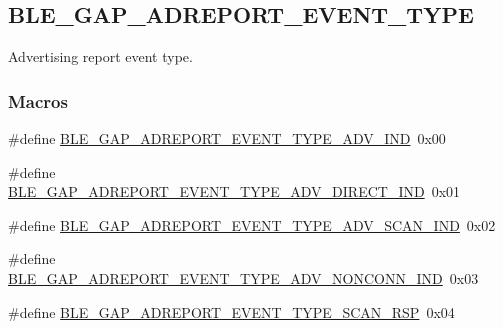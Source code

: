 \hypertarget{group___b_l_e___g_a_p___a_d_r_e_p_o_r_t___e_v_e_n_t___t_y_p_e}{}\subsection{B\+L\+E\+\_\+\+G\+A\+P\+\_\+\+A\+D\+R\+E\+P\+O\+R\+T\+\_\+\+E\+V\+E\+N\+T\+\_\+\+T\+Y\+PE}
\label{group___b_l_e___g_a_p___a_d_r_e_p_o_r_t___e_v_e_n_t___t_y_p_e}


Advertising report event type.  


\subsubsection*{Macros}
\begin{DoxyCompactItemize}
\item 
\#define \hyperlink{group___b_l_e___g_a_p___a_d_r_e_p_o_r_t___e_v_e_n_t___t_y_p_e_ga6bb482dae16c06831c3ade2057ad8365}{B\+L\+E\+\_\+\+G\+A\+P\+\_\+\+A\+D\+R\+E\+P\+O\+R\+T\+\_\+\+E\+V\+E\+N\+T\+\_\+\+T\+Y\+P\+E\+\_\+\+A\+D\+V\+\_\+\+I\+ND}~0x00
\item 
\#define \hyperlink{group___b_l_e___g_a_p___a_d_r_e_p_o_r_t___e_v_e_n_t___t_y_p_e_ga32215d36f7b60058d262a8648de92d38}{B\+L\+E\+\_\+\+G\+A\+P\+\_\+\+A\+D\+R\+E\+P\+O\+R\+T\+\_\+\+E\+V\+E\+N\+T\+\_\+\+T\+Y\+P\+E\+\_\+\+A\+D\+V\+\_\+\+D\+I\+R\+E\+C\+T\+\_\+\+I\+ND}~0x01
\item 
\#define \hyperlink{group___b_l_e___g_a_p___a_d_r_e_p_o_r_t___e_v_e_n_t___t_y_p_e_gafa7c714a9a1e84a12bf953f42a290a47}{B\+L\+E\+\_\+\+G\+A\+P\+\_\+\+A\+D\+R\+E\+P\+O\+R\+T\+\_\+\+E\+V\+E\+N\+T\+\_\+\+T\+Y\+P\+E\+\_\+\+A\+D\+V\+\_\+\+S\+C\+A\+N\+\_\+\+I\+ND}~0x02
\item 
\#define \hyperlink{group___b_l_e___g_a_p___a_d_r_e_p_o_r_t___e_v_e_n_t___t_y_p_e_ga5a43b358d1ea2c89d4c5761cfef14b1d}{B\+L\+E\+\_\+\+G\+A\+P\+\_\+\+A\+D\+R\+E\+P\+O\+R\+T\+\_\+\+E\+V\+E\+N\+T\+\_\+\+T\+Y\+P\+E\+\_\+\+A\+D\+V\+\_\+\+N\+O\+N\+C\+O\+N\+N\+\_\+\+I\+ND}~0x03
\item 
\#define \hyperlink{group___b_l_e___g_a_p___a_d_r_e_p_o_r_t___e_v_e_n_t___t_y_p_e_ga41c1d44a55b98b7790ebb4020e1de75e}{B\+L\+E\+\_\+\+G\+A\+P\+\_\+\+A\+D\+R\+E\+P\+O\+R\+T\+\_\+\+E\+V\+E\+N\+T\+\_\+\+T\+Y\+P\+E\+\_\+\+S\+C\+A\+N\+\_\+\+R\+SP}~0x04
\end{DoxyCompactItemize}


